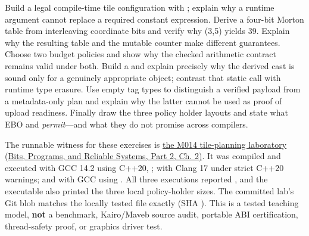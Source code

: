 Build a legal compile-time tile configuration with ; explain why a runtime argument cannot replace a required constant expression. Derive a four-bit Morton table from interleaving coordinate bits and verify why (3,5) yields 39. Explain why the resulting  table and the  mutable counter make different guarantees. Choose two budget policies and show why the checked arithmetic contract remains valid under both. Build a  and explain precisely why the derived cast is sound only for a genuinely appropriate object; contrast that static call with runtime type erasure. Use empty tag types to distinguish a verified payload from a metadata-only plan and explain why the latter cannot be used as proof of upload readiness. Finally draw the three policy holder layouts and state what EBO and  \emph{permit}---and what they do not promise across compilers.

The runnable witness for these exercises is \href{../01-Bits-Programs-and-Reliable-Systems-P02/main.pdf\#source-file-f5eb017280bb6b2ae6b1475d}{the M014 tile-planning laboratory (Bits, Programs, and Reliable Systems, Part 2, Ch. 2)}. It was compiled and executed with GCC 14.2 using C++20, ; with Clang 17 under strict C++20 warnings; and with GCC using . All three executions reported , and the executable also printed the three local policy-holder sizes. The committed lab's Git blob matches the locally tested file exactly (SHA ). This is a tested teaching model, \textbf{not} a benchmark, Kairo/Maveb source audit, portable ABI certification, thread-safety proof, or graphics driver test.


